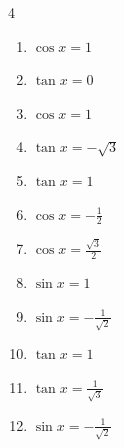\begin{multicols}{4}
\begin{enumerate}
\columnbreak %

  \item $\displaystyle \cos{x}  = 1$

        \phantom{$\displaystyle x = 0$}

  \item $\displaystyle \tan{x}  = 0$

        \phantom{$\displaystyle x = 0 , \pi$}

  \item $\displaystyle \cos{x}  = 1$

        \phantom{$\displaystyle x = 0$}

  \item $\displaystyle \tan{x}  = -\sqrt{3}$


  \item $\displaystyle \tan{x}  = 1$


  \item $\displaystyle \cos{x}  = -\frac{1}{2}$


  \item $\displaystyle \cos{x}  = \frac{\sqrt{3}}{2}$


  \item $\displaystyle \sin{x}  = 1$


  \item $\displaystyle \sin{x}  = -\frac{1}{\sqrt{2}}$


  \item $\displaystyle \tan{x}  = 1$


  \item $\displaystyle \tan{x}  = \frac{1}{\sqrt{3}}$


  \item $\displaystyle \sin{x}  = -\frac{1}{\sqrt{2}}$


\end{enumerate}
\end{multicols}

